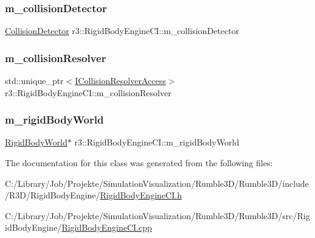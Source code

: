 \subsubsection{\texorpdfstring{m\+\_\+collision\+Detector}{m\_collisionDetector}}
{\footnotesize\ttfamily \mbox{\hyperlink{classr3_1_1_collision_detector}{Collision\+Detector}} r3\+::\+Rigid\+Body\+Engine\+C\+I\+::m\+\_\+collision\+Detector\hspace{0.3cm}{\ttfamily [protected]}}

\mbox{\label{classr3_1_1_rigid_body_engine_c_i_a27f09a82ab77919c2fb78869f6d3c035}} 
\subsubsection{\texorpdfstring{m\+\_\+collision\+Resolver}{m\_collisionResolver}}
{\footnotesize\ttfamily std\+::unique\+\_\+ptr$<$\mbox{\hyperlink{classr3_1_1_i_collision_resolver_access}{I\+Collision\+Resolver\+Access}}$>$ r3\+::\+Rigid\+Body\+Engine\+C\+I\+::m\+\_\+collision\+Resolver\hspace{0.3cm}{\ttfamily [protected]}}

\mbox{\label{classr3_1_1_rigid_body_engine_c_i_afd7ae3fcba8b88ec6c31f2df56aae3f6}} 
\subsubsection{\texorpdfstring{m\+\_\+rigid\+Body\+World}{m\_rigidBodyWorld}}
{\footnotesize\ttfamily \mbox{\hyperlink{classr3_1_1_rigid_body_world}{Rigid\+Body\+World}}$\ast$ r3\+::\+Rigid\+Body\+Engine\+C\+I\+::m\+\_\+rigid\+Body\+World\hspace{0.3cm}{\ttfamily [protected]}}



The documentation for this class was generated from the following files\+:\begin{DoxyCompactItemize}
\item 
C\+:/\+Library/\+Job/\+Projekte/\+Simulation\+Visualization/\+Rumble3\+D/\+Rumble3\+D/include/\+R3\+D/\+Rigid\+Body\+Engine/\mbox{\hyperlink{_rigid_body_engine_c_i_8h}{Rigid\+Body\+Engine\+C\+I.\+h}}\item 
C\+:/\+Library/\+Job/\+Projekte/\+Simulation\+Visualization/\+Rumble3\+D/\+Rumble3\+D/src/\+Rigid\+Body\+Engine/\mbox{\hyperlink{_rigid_body_engine_c_i_8cpp}{Rigid\+Body\+Engine\+C\+I.\+cpp}}\end{DoxyCompactItemize}
